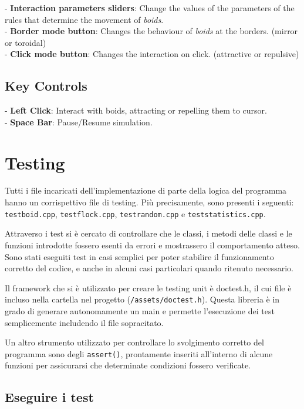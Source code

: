 \documentclass[10pt,a4paper]{article}
\begin{document}
- \textbf{Interaction parameters sliders}: Change the values of the parameters of the rules that determine the movement of \textit{boids}. \\
- \textbf{Border mode button}: Changes the behaviour of \textit{boids} at the borders. (mirror or toroidal) \\
- \textbf{Click mode button}: Changes the interaction on click. (attractive or repulsive)

\subsection{Key Controls}

- \textbf{Left Click}: Interact with boids, attracting or repelling them to cursor. \\
- \textbf{Space Bar}: Pause/Resume simulation.

\newpage

\section{Testing}

Tutti i file incaricati dell'implementazione di parte della logica del programma hanno un corrispettivo file di testing. Più precisamente, sono presenti i seguenti: \texttt{testboid.cpp}, \texttt{testflock.cpp}, \texttt{testrandom.cpp} e \texttt{teststatistics.cpp}. 

Attraverso i test si è cercato di controllare che le classi, i metodi delle classi e le funzioni introdotte fossero esenti da errori e mostrassero il comportamento atteso. Sono stati eseguiti test in casi semplici per poter stabilire il funzionamento corretto del codice, e anche in alcuni casi particolari quando ritenuto necessario.

Il framework che si è utilizzato per creare le testing unit è doctest.h, il cui file è incluso nella cartella nel progetto (\texttt{/assets/doctest.h}). Questa libreria è in grado di generare autonomamente un main e permette l'esecuzione dei test semplicemente includendo il file sopracitato.

Un altro strumento utilizzato per controllare lo svolgimento corretto del programma sono degli \texttt{assert()}, prontamente inseriti all'interno di alcune funzioni per assicurarsi che determinate condizioni fossero verificate.

\subsection{Eseguire i test}
\end{document}
